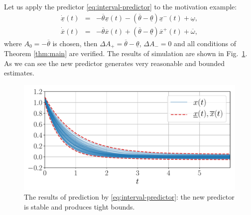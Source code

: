 \begin{example*}
	 Let us apply the predictor \eqref{eq:interval-predictor}
	to the motivation example:
	\begin{eqnarray*}
		\dot{\underline{x}}(t) & = & -\overline{\theta}\underline{x}(t)-(\overline{\theta}-\underline{\theta})\underline{x}^{-}(t)+\underline{\omega},\\
		\dot{\overline{x}}(t) & = & -\overline{\theta}\overline{x}(t)+(\overline{\theta}-\underline{\theta})\overline{x}^{+}(t)+\overline{\omega},
	\end{eqnarray*}
	where $A_{0}=-\overline{\theta}$ is chosen, then $\Delta A_{+}=\overline{\theta}-\underline{\theta}$, $\Delta A_{-}=0$ and all conditions of Theorem \ref{thm:main} are verified. The results of simulation are shown in Fig.~\ref{fig:IP_New}. As we can see the new predictor generates very reasonable and bounded estimates. 
	\begin{figure}
		\begin{centering}
			\includegraphics[width=0.8\linewidth]{img/predictor}
			\par\end{centering}
		\caption{\label{fig:IP_New} The results of prediction by \eqref{eq:interval-predictor}: the new predictor is stable and produces tight bounds.}
	\end{figure}
\end{example*}


